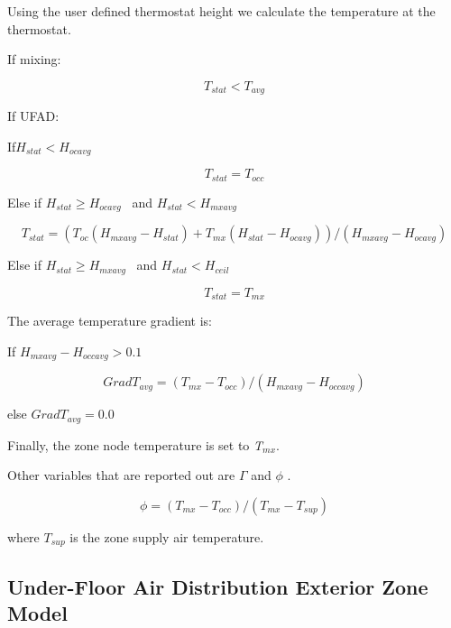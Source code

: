 Using the user defined thermostat height we calculate the temperature at the thermostat.

If mixing:

\begin{equation}
{T_{stat}} < {T_{avg}}
\end{equation}

If UFAD:

If\({H_{stat}} < {H_{ocavg}}\)

\begin{equation}
{T_{stat}} = {T_{occ}}
\end{equation}

Else if \({H_{stat}} \ge {H_{ocavg}}\) ~and \({H_{stat}} < {H_{mxavg}}\)

\begin{equation}
{T_{stat}} = \left( {{T_{oc}}\left( {{H_{mxavg}} - {H_{stat}}} \right) + {T_{mx}}\left( {{H_{stat}} - {H_{ocavg}}} \right)} \right)/\left( {{H_{mxavg}} - {H_{ocavg}}} \right)
\end{equation}

Else if \({H_{stat}} \ge {H_{mxavg}}\) ~and \({H_{stat}} < {H_{ceil}}\)

\begin{equation}
{T_{stat}} = {T_{mx}}
\end{equation}

The average temperature gradient is:

If \({H_{mxavg}} - {H_{occavg}} > 0.1\)

\begin{equation}
Grad{T_{avg}} = ({T_{mx}} - {T_{occ}})/({H_{mxavg}} - {H_{occavg}})
\end{equation}

else \(Grad{T_{avg}} = 0.0\)

Finally, the zone node temperature is set to \emph{T\(_{mx}\)}.

Other variables that are reported out are \(\Gamma\) and \(\phi\) .

\begin{equation}
\phi  = ({T_{mx}} - {T_{occ}})/({T_{mx}} - {T_{sup}})
\end{equation}

where \({T_{sup}}\) is the zone supply air temperature.

\subsection{Under-Floor Air Distribution Exterior Zone Model}\label{under-floor-air-distribution-exterior-zone-model}

